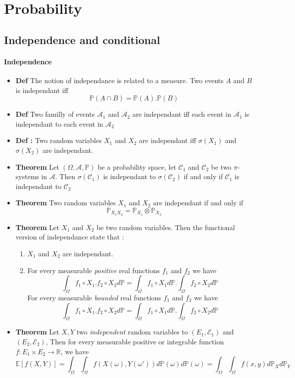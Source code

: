 \documentclass[a4paper,10pt]{article}
\begin{document}
\section{Probability}
\subsection{Independence and conditional}
\paragraph{Independence}
\begin{itemize}
\renewcommand{\labelitemi}{$\vcenter{\hbox{\tiny$\bullet$}}$}
 \item \textbf{Def} The notion of independance is related to a measure. Two events $A$ and $B$ is independant iff 
 \[
  \mathbb{P}(A \cap B ) = \mathbb{P}(A). \mathbb{P}(B) 
 \]
 \item \textbf{Def} Two familly of events $\mathcal{A}_1$ and $\mathcal{A}_2$ are independant iff each event in $\mathcal{A}_1$ is independant to each event in $\mathcal{A}_2$
 \item \textbf{Def : } Two random variables $X_1$ and $X_2$ are independant iff  $\sigma(X_1)$ and $\sigma(X_2)$ are independant.
 \item \textbf{Theorem } Let $(\Omega,\mathcal{A},\mathbb{P})$ be a probability space, let $\mathcal{C}_1$ and $\mathcal{C}_2$ be two $\pi$-systems in $\mathcal{A}$. Then $\sigma(\mathcal{C}_1)$ is independant to $\sigma(\mathcal{C}_2)$ if and only if $\mathcal{C}_1$ is independant to $\mathcal{C}_2$
 \item \textbf{Theorem } Two random variables $X_1$ and $X_2$ are independant if and only if 
 \[
 \mathbb{P}_{X_1X_2} = \mathbb{P}_{X_1} \otimes \mathbb{P}_{X_2}
 \]
 \item \textbf{Theorem } Let $X_1$ and $X_2$ be two random variables. Then the functional version of independance state that :
 \begin{enumerate}[i]
  \item $X_1$ and $X_2$ are independant.
  \item For every measurable \textit{positive} real functions $f_1$ and $f_2$ we have 
  \[
    \int_{\Omega} f_1 \circ X_1 . f_2 \circ X_2 d\mathbb{P} = \int_{\Omega} f_1 \circ X_1 d\mathbb{P} . \int_{\Omega} f_2 \circ X_2 d\mathbb{P} 
  \]
  For every measurable \textit{bounded} real functions $f_1$ and $f_2$ we have 
  \[
    \int_{\Omega} f_1 \circ X_1 . f_2 \circ X_2 d\mathbb{P} = \int_{\Omega} f_1 \circ X_1 d\mathbb{P} . \int_{\Omega} f_2 \circ X_2 d\mathbb{P} 
  \]
 \end{enumerate}
 \item \textbf{Theorem } Let $X,Y$ two \textit{independent} random variables to $(E_1,\mathcal{E}_1)$ and $(E_2,\mathcal{E}_2)$, Then for every measurable positive or integrable function $f : E_1\times E_2 \longrightarrow \mathbb{R}$, we have
 \[
 \mathbb{E}[f(X,Y)] = \int_{\Omega}\int_{\Omega} f(X(\omega),Y(\omega')) d\mathbb{P}(\omega)d\mathbb{P}(\omega)
                    = \int_{\Omega}\int_{\Omega} f(x,y) d\mathbb{P}_{X}d\mathbb{P}_{Y}
 \]
\end{itemize}
\end{document}
